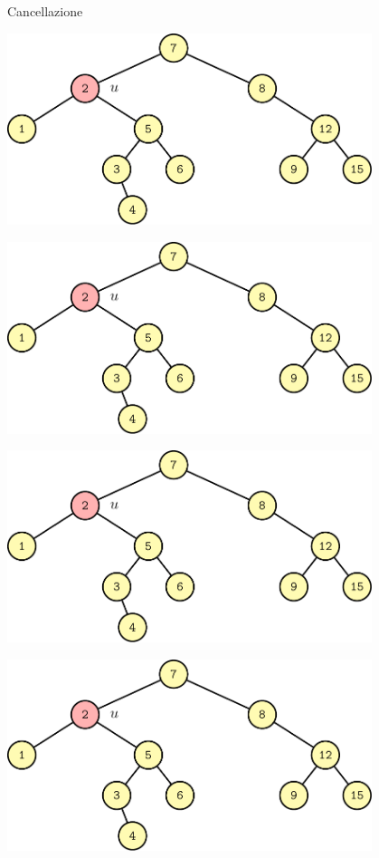 \begin{frame}{Cancellazione}

\begin{overprint}
\begin{center} \includegraphics[width=0.8\textwidth,page=1]{delete2.pdf} \end{center}
\begin{center} \includegraphics[width=0.8\textwidth,page=2]{delete2.pdf} \end{center}
\begin{center} \includegraphics[width=0.8\textwidth,page=3]{delete2.pdf} \end{center}
\begin{center} \includegraphics[width=0.8\textwidth,page=4]{delete2.pdf} \end{center}

\end{overprint}
\end{frame}
